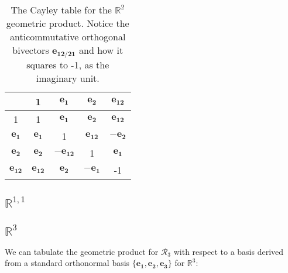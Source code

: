 \documentclass[a4paper]{book}
\numberwithin{equation}{chapter}
\begin{document}
\begin{table}[h]
\centering
\begin{tabular}{|c|c|c|c|c|}
\hline
\cellcolor[HTML]{FAFF9F} &
  \cellcolor[HTML]{EDE2B7}1 &
  \cellcolor[HTML]{E1C4CF}$\mathbf{e_1}$ &
  \cellcolor[HTML]{D5A7E7}$\mathbf{e_2}$ &
  \cellcolor[HTML]{C88AFF}$\mathbf{e_{12}}$ \\ \hline
\cellcolor[HTML]{EDE2B7}1 &
  \cellcolor[HTML]{FAFF9F}1 &
  \cellcolor[HTML]{E1C4CF}$\mathbf{e_1}$ &
  \cellcolor[HTML]{D5A7E7}$\mathbf{e_2}$ &
  \cellcolor[HTML]{C88AFF}$\mathbf{e_{12}}$ \\ \hline
\cellcolor[HTML]{E1C4CF}$\mathbf{e_1}$ &
  \cellcolor[HTML]{E1C4CF}$\mathbf{e_1}$ &
  \cellcolor[HTML]{FAFF9F}1 &
  \cellcolor[HTML]{C88AFF}$\mathbf{e_{12}}$ &
  \cellcolor[HTML]{D5A7E7}$-\mathbf{e_2}$ \\ \hline
\cellcolor[HTML]{D5A7E7}$\mathbf{e_2}$ &
  \cellcolor[HTML]{D5A7E7}$\mathbf{e_2}$ &
  \cellcolor[HTML]{C88AFF}$-\mathbf{e_{12}}$ &
  \cellcolor[HTML]{FAFF9F}1 &
  \cellcolor[HTML]{E1C4CF}$\mathbf{e_1}$ \\ \hline
\cellcolor[HTML]{C88AFF}$\mathbf{e_{12}}$ &
  \cellcolor[HTML]{C88AFF}$\mathbf{e_{12}}$ &
  \cellcolor[HTML]{D5A7E7}$\mathbf{e_2}$ &
  \cellcolor[HTML]{E1C4CF}$-\mathbf{e_1}$ &
  \cellcolor[HTML]{FAFF9F}-1 \\ \hline
\end{tabular}
\caption{The Cayley table for the $\mathbb{R}^2$ geometric product. Notice the anticommutative orthogonal bivectors
$\mathbf{e_{12/21}}$ and how it squares to -1, as the imaginary unit.}
\label{tab:my-table}
\end{table}
    
    \subsection{$\mathbb{R}^{1,1}$}
    
    \subsection{$\mathbb{R}^3$}

We can tabulate the geometric product for $\mathcal{R}_3$
with respect to a basis derived from a standard orthonormal
basis $\{ \mathbf{e_1,e_2,e_3}\}$ for $\mathbb{R}^3$:
\end{document}
